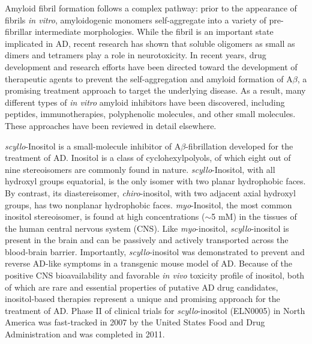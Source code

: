 Amyloid fibril formation follows a complex pathway: prior to the appearance of fibrils \emph{in vitro}, amyloidogenic monomers self-aggregate into a variety of pre-fibrillar intermediate morphologies. While the fibril is an important state implicated in AD, recent research has shown that soluble oligomers as small as dimers and tetramers play a role in neurotoxicity.\cite{Bernstein:2009p165} In recent years, drug development and research efforts have been directed toward the development of therapeutic agents to prevent the self-aggregation and amyloid formation of A$\beta$, a promising treatment approach to target the underlying disease.\cite{Masters:2006p183,Citron:2010p214,Dasilva:2010p25} As a result, many different types of \emph{in vitro} amyloid inhibitors have been discovered, including peptides,\cite{EsterasChopo:2008p219,Sciarretta:2006p181,Chalifour:2003p161,Scrocchi:2002p178,Soto:2007dm} immunotherapies,\cite{Janus:2000p198,Solomon:2010p177} polyphenolic molecules,\cite{Masuda:2009p205,Berhanu:2010p230,Ehrnhoefer:2008p8} and other small molecules.\cite{Hawkes:2009p189,Masuda:2009p205,Necula:2007p227,Nitz:2008p13} These approaches have been reviewed in detail elsewhere.\cite{Citron:2010p214,Dasilva:2010p25}

\emph{scyllo}-Inositol is a small-molecule inhibitor of A$\beta$-fibrillation developed for the treatment of AD.\cite{McLaurin:2006p29,McLaurin:2000p64,Fenili:2007p182,Ma:2012jk} Inositol is a class of cyclohexylpolyols, of which eight out of nine stereoisomers are commonly found in nature. \emph{scyllo}-Inositol, with all hydroxyl groups equatorial,  is the only isomer with two planar hydrophobic faces. By contrast, its diastereisomer, \emph{chiro}-inositol, with two adjacent axial hydroxyl groups, has two nonplanar  hydrophobic faces. \emph{myo}-Inositol, the most common inositol stereoisomer, is found at high concentrations ($\sim$5 mM) in the tissues of the human central nervous system (CNS).\cite{Fisher:2002p62} Like \emph{myo}-inositol, \emph{scyllo}-inositol is present in the brain and can be passively and actively transported across the blood-brain barrier.\cite{Fenili:2007p182} Importantly, \emph{scyllo}-inositol was demonstrated to prevent and reverse AD-like symptoms in a transgenic mouse model of AD.\cite{McLaurin:2006p29} Because of the positive CNS bioavailability and favorable \emph{in vivo} toxicity profile of inositol, both of which are rare and essential properties of putative AD drug candidates, inositol-based therapies represent a unique and promising approach for the treatment of AD. Phase II of clinical trials for \emph{scyllo}-inositol (ELN0005) in North America was fast-tracked in 2007 by the United States Food and Drug Administration and was completed in 2011.\cite{Salloway:2011im,Ma:2012jk}

